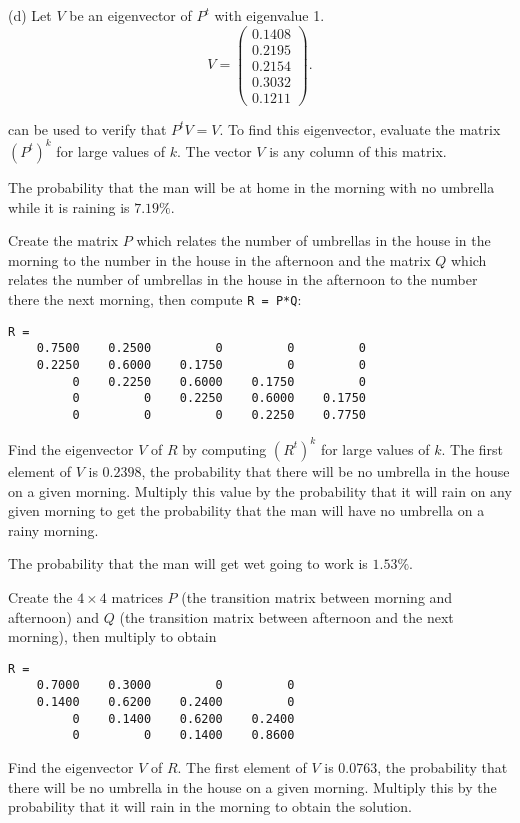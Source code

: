 \documentclass{ximera}
\begin{document}
(d) \ans Let $V$ be an eigenvector of $P^t$ with eigenvalue 1.
\[
V = \left(\begin{array}{r} 0.1408 \\ 0.2195 \\ 0.2154 \\ 0.3032
\\ 0.1211 \end{array}\right).
\]

\soln \Matlab can be used to verify that $P^tV = V$.  To find this
eigenvector, evaluate the matrix $(P^t)^k$ for large values of $k$.
The vector $V$ is any column of this matrix.

\ans The probability that the man will be at home in the morning with
no umbrella while it is raining is $7.19\%$. 

\soln Create the matrix $P$ which relates the number of umbrellas in the
house in the morning to the number in the house in the afternoon and the
matrix $Q$ which relates the number of umbrellas in the house in the
afternoon to the number there the next morning, then compute {\tt R = P*Q}:
\begin{verbatim}
R =
    0.7500    0.2500         0         0         0
    0.2250    0.6000    0.1750         0         0
         0    0.2250    0.6000    0.1750         0
         0         0    0.2250    0.6000    0.1750
         0         0         0    0.2250    0.7750
\end{verbatim}
Find the eigenvector $V$ of $R$ by computing $(R^t)^k$ for large values
of $k$.  The first element of $V$ is $0.2398$, the probability that there
will be no umbrella in the house on a given morning.  Multiply this
value by the probability that it will rain on any given morning to get
the probability that the man will have no umbrella on a rainy morning.


\ans The probability that the man will get wet going to work is $1.53\%$.

\soln Create the $4 \times 4$ matrices $P$ (the transition matrix between
morning and afternoon) and $Q$ (the transition matrix between afternoon
and the next morning), then multiply to obtain \begin{verbatim}
R =
    0.7000    0.3000         0         0
    0.1400    0.6200    0.2400         0
         0    0.1400    0.6200    0.2400
         0         0    0.1400    0.8600
\end{verbatim}
Find the eigenvector $V$ of $R$.  The first element of $V$ is $0.0763$,
the probability that there will be no umbrella in the house on a given
morning.  Multiply this by the probability that it will rain in the
morning to obtain the solution.
\end{document}
